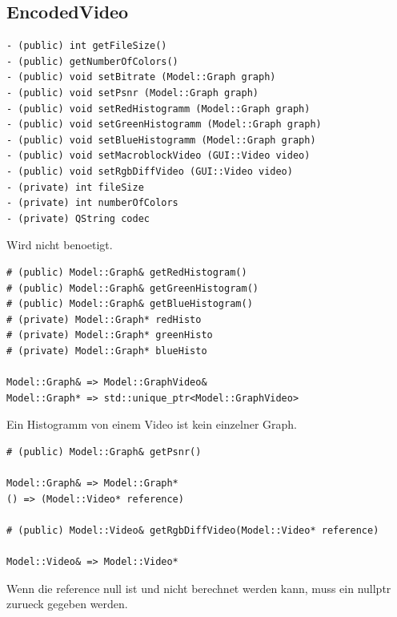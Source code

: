 \documentclass[parskip=full]{scrartcl}
\begin{document}
\subsection{EncodedVideo}
\begin{verbatim}
- (public) int getFileSize()
- (public) getNumberOfColors()
- (public) void setBitrate (Model::Graph graph)
- (public) void setPsnr (Model::Graph graph)
- (public) void setRedHistogramm (Model::Graph graph)
- (public) void setGreenHistogramm (Model::Graph graph)
- (public) void setBlueHistogramm (Model::Graph graph)
- (public) void setMacroblockVideo (GUI::Video video)
- (public) void setRgbDiffVideo (GUI::Video video)
- (private) int fileSize
- (private) int numberOfColors
- (private) QString codec
\end{verbatim}
Wird nicht benoetigt.
\begin{verbatim}
# (public) Model::Graph& getRedHistogram()
# (public) Model::Graph& getGreenHistogram()
# (public) Model::Graph& getBlueHistogram()
# (private) Model::Graph* redHisto
# (private) Model::Graph* greenHisto
# (private) Model::Graph* blueHisto

Model::Graph& => Model::GraphVideo&
Model::Graph* => std::unique_ptr<Model::GraphVideo>
\end{verbatim}
Ein Histogramm von einem Video ist kein einzelner Graph.
\begin{verbatim}
# (public) Model::Graph& getPsnr()

Model::Graph& => Model::Graph*
() => (Model::Video* reference)

# (public) Model::Video& getRgbDiffVideo(Model::Video* reference)

Model::Video& => Model::Video*
\end{verbatim}
Wenn die reference null ist und nicht berechnet werden kann, muss ein nullptr zurueck gegeben werden.
\end{document}
